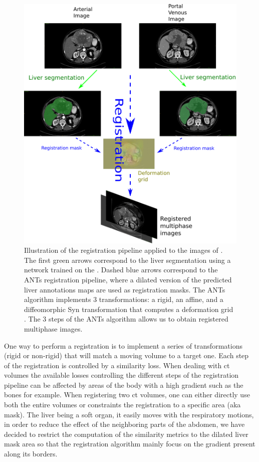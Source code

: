 \begin{figure}[th!]
\centering
\includegraphics[width=0.7\linewidth]{images/RegistrationTCIA_pipeline_vertical2}
\caption{Illustration of the registration pipeline applied to the images of . The first green arrows correspond to the liver segmentation using a network trained on the . Dashed blue arrows correspond to the ANTs registration pipeline, where a dilated version of the predicted liver annotations maps are used as registration masks. The ANTs algorithm implements 3 transformations: a rigid, an affine, and a diffeomorphic Syn transformation that computes a deformation grid \cite{Avants2008}. The 3 steps of the ANTs algorithm allows us to obtain registered multiphase images.}
\label{fig:RegistrationTCIA_pipeline_vertical2}
\end{figure}




One way to perform a registration is to implement a series of
transformations (rigid or non-rigid) that will match a moving volume to
a target one. Each step of the registration is controlled by a
similarity loss.
When dealing with \ac{ct} volumes the available losses controlling the
different steps of the registration pipeline can be affected by areas of
the body with a high gradient such as the bones for example. When
registering two \ac{ct} volumes, one can either directly use both the entire
volumes or constraints the registration to a specific area (aka mask).
The liver being a soft organ, it easily moves with the respiratory
motions, in order to reduce the effect of the neighboring parts of the
abdomen, we have decided to restrict the computation of the similarity
metrics to the dilated liver mask area so that the registration
algorithm mainly focus on the gradient present along its borders.

